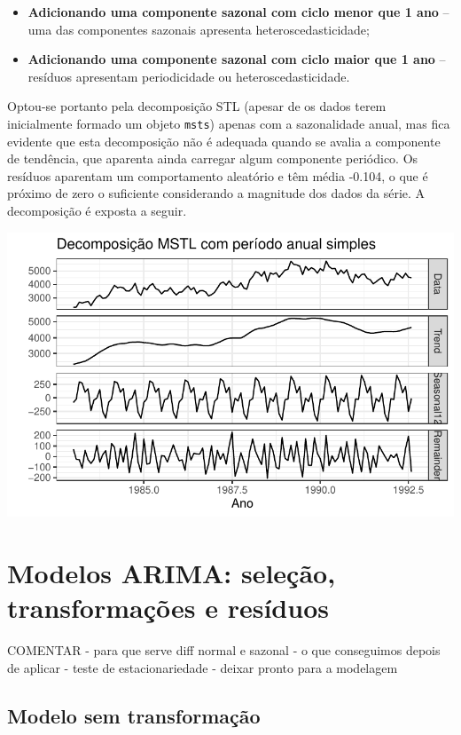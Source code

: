 \documentclass[
  letterpaper,
  DIV=11,
  numbers=noendperiod]{scrartcl}
\providecommand{\tightlist}{%
  \setlength{\itemsep}{0pt}\setlength{\parskip}{0pt}}\usepackage{longtable,booktabs,array}
\begin{document}
\begin{itemize}
\tightlist
\item
  \textbf{Adicionando uma componente sazonal com ciclo menor que 1 ano}
  -- uma das componentes sazonais apresenta heteroscedasticidade;
\item
  \textbf{Adicionando uma componente sazonal com ciclo maior que 1 ano}
  -- resíduos apresentam periodicidade ou heteroscedasticidade.
\end{itemize}

Optou-se portanto pela decomposição STL (apesar de os dados terem
inicialmente formado um objeto \texttt{msts}) apenas com a sazonalidade
anual, mas fica evidente que esta decomposição não é adequada quando se
avalia a componente de tendência, que aparenta ainda carregar algum
componente periódico. Os resíduos aparentam um comportamento aleatório e
têm média -0.104, o que é próximo de zero o suficiente considerando a
magnitude dos dados da série. A decomposição é exposta a seguir.

\includegraphics{T2_grupo5_files/figure-pdf/grafico-mstl-1.pdf}

\hypertarget{modelos-arima-seleuxe7uxe3o-transformauxe7uxf5es-e-resuxedduos}{%
\section{Modelos ARIMA: seleção, transformações e
resíduos}\label{modelos-arima-seleuxe7uxe3o-transformauxe7uxf5es-e-resuxedduos}}

COMENTAR - para que serve diff normal e sazonal - o que conseguimos
depois de aplicar - teste de estacionariedade - deixar pronto para a
modelagem

\hypertarget{modelo-sem-transformauxe7uxe3o}{%
\subsection{Modelo sem
transformação}\label{modelo-sem-transformauxe7uxe3o}}
\end{document}
